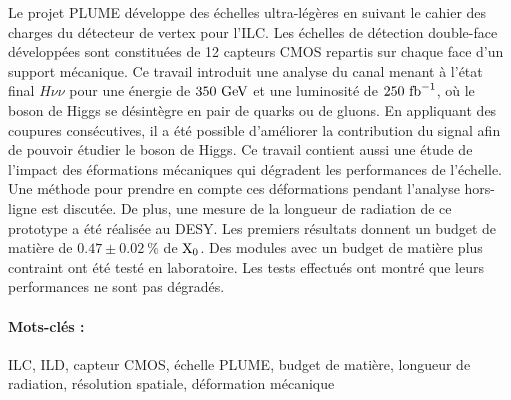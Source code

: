 Le projet PLUME développe des échelles ultra-légères en suivant le cahier des charges du détecteur de vertex pour l'ILC.
Les échelles de détection double-face développées sont constituées de 12 capteurs CMOS repartis sur chaque face d’un support mécanique.
Ce travail introduit une analyse du canal menant à l’état final $H\nu\nu$ pour une énergie de $350~\rm{GeV}$ et une luminosité de $250~\rm{fb}^{-1}$, où le boson de Higgs se désintègre en pair de quarks ou de gluons. 
En appliquant des coupures consécutives, il a été possible d'améliorer la contribution du signal afin de pouvoir étudier le boson de Higgs.
Ce travail contient aussi une étude de l'impact des éformations mécaniques qui dégradent les performances de l'échelle.
Une méthode pour prendre en compte ces déformations pendant l'analyse hors-ligne est discutée.
De plus, une mesure de la longueur de radiation de ce prototype a été réalisée au DESY.
Les premiers résultats donnent un budget de matière de $0.47 \pm 0.02~\%$ de $\rm{X_0}$.
Des modules avec un budget de matière plus contraint ont été testé en laboratoire.
Les tests effectués ont montré que leurs performances ne sont pas dégradés. 

\paragraph{Mots-clés :} ILC, ILD, capteur CMOS, échelle PLUME, budget de matière, longueur de radiation, résolution spatiale, déformation mécanique
